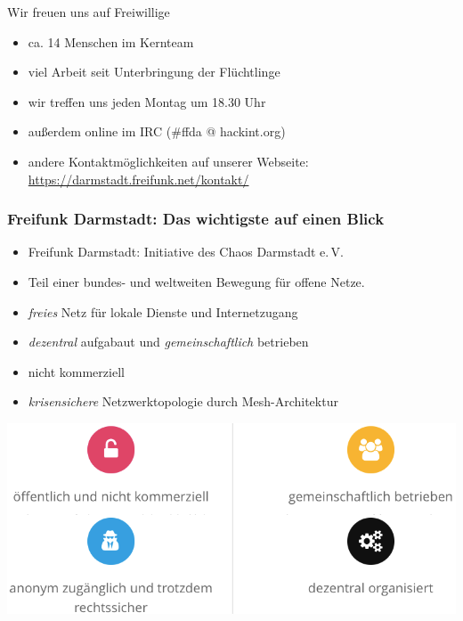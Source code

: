 \documentclass[10pt]{beamer}
\begin{document}
\begin{frame}{Wir freuen uns auf Freiwillige}
	\begin{itemize}
		\item ca. 14 Menschen im Kernteam	
		\item viel Arbeit seit Unterbringung der Flüchtlinge
		\vfill
		\pause
		\item wir treffen uns jeden Montag um 18.30 Uhr
		\item außerdem online im IRC (\#ffda @ hackint.org)
		\item andere Kontaktmöglichkeiten auf unserer Webseite:\\
		\url{https://darmstadt.freifunk.net/kontakt/}
	\end{itemize}
\end{frame}

\begin{frame}
	\frametitle{Freifunk Darmstadt: Das wichtigste auf einen Blick}
	\begin{centering}
	\begin{itemize}
		\item Freifunk Darmstadt: Initiative des Chaos Darmstadt e.\,V.
		\item Teil einer bundes- und weltweiten Bewegung für offene Netze.
		\item \emph{freies} Netz für lokale Dienste und Internetzugang
		\item \emph{dezentral} aufgabaut und \emph{gemeinschaftlich} betrieben
		\item nicht kommerziell %
		\item \emph{krisensichere} Netzwerktopologie durch Mesh-Architektur
	\end{itemize}
	\includegraphics[width=1.0\textheight]{images/principles}$\;$
	\end{centering}


\end{frame}
\end{document}
